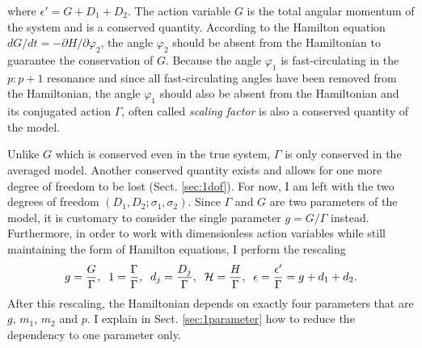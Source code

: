 \documentclass[12pt,a4paper,oneside]{article}
\begin{document}
where $\epsilon'=G+D_1+D_2$. The action variable $G$ is the total angular momentum of the system and is a conserved quantity. According to the Hamilton equation $dG/dt=-\partial H/\partial\varphi_2$, the angle $\varphi_2$ should be absent from the Hamiltonian to guarantee the conservation of $G$. Because the angle $\varphi_1$ is fast-circulating in the $p:p+1$ resonance and since all fast-circulating angles have been removed from the Hamiltonian, the angle $\varphi_1$ should also be absent from the Hamiltonian and its conjugated action $\Gamma$, often called \textit{scaling factor} \citep{Michtchenko2008,Delisle2017,Petit2020} is also a conserved quantity of the model.

Unlike $G$ which is conserved even in the true system, $\Gamma$ is only conserved in the averaged model. Another conserved quantity exists and allows for one more degree of freedom to be lost (Sect. \ref{sec:1dof}). For now, I am left with the two degrees of freedom $\left(D_1,D_2;\sigma_1,\sigma_2\right)$. Since $\Gamma$ and $G$ are two parameters of the model, it is customary to consider the single parameter $g=G/\Gamma$ instead. Furthermore, in order to work with dimensionless action variables while still maintaining the form of Hamilton equations, I perform the rescaling
\begin{equation}
	g=\frac{G}{\Gamma},\;\;1=\frac{\Gamma}{\Gamma},\;\;d_j=\frac{D_j}{\Gamma},\;\;\mathcal{H}=\frac{H}{\Gamma},\;\;\epsilon=\frac{\epsilon'}{\Gamma}=g+d_1+d_2.
\end{equation}
After this rescaling, the Hamiltonian depends on exactly four parameters that are $g$, $m_1$, $m_2$ and $p$. I explain in Sect. \ref{sec:1parameter} how to reduce the dependency to one parameter only.
\end{document}
